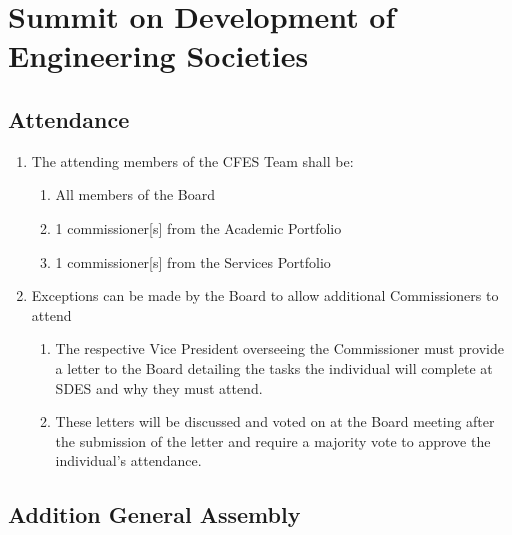 \section{Summit on Development of Engineering Societies}
\label{summit-on-development-of-engineering-societies}

\subsection{Attendance}
\label{attendance-3}

\begin{enumerate}
 \item
  The attending members of the CFES Team shall be:

  \begin{enumerate}
   \item
    All members of the Board
   \item
    1 commissioner{[}s{]} from the Academic Portfolio
   \item
    1 commissioner{[}s{]} from the Services Portfolio
  \end{enumerate}

 \item
  Exceptions can be made by the Board to allow additional Commissioners to attend

  \begin{enumerate}
   \item
    The respective Vice President overseeing the Commissioner must provide a letter to the Board detailing the tasks the individual will complete at SDES and why they must attend.
   \item
    These letters will be discussed and voted on at the Board meeting after the submission of the letter and require a majority vote to approve the individual's attendance.
  \end{enumerate}
\end{enumerate}

\subsection{Addition General Assembly}
\label{addition-general-assembly}

